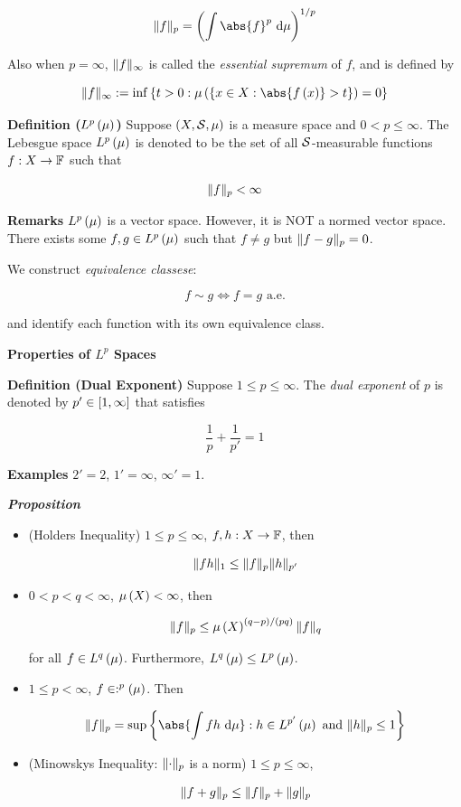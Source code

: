 \documentclass[
]{article}
\begin{document}
\[\norm{f}_p = \pr{\int \abs{f}^p\dm}^{1/p}\]

Also when \(p = \infty\), \(\norm{f}_{\infty}\) is called the
\emph{essential supremum} of \(f\), and is defined by

\[\norm{f}_{\infty}:=\inf\brace{t>0:\lm{\brace{x\in X:\abs{f\pr{x}}>t}} = 0}\]

\textbf{Definition (\(L^p\pr{\mu}\))} Suppose \(\pr{X,\S,\mu}\) is a
measure space and \(0<p\le \infty\). The Lebesgue space \(L^p\pr{\mu}\)
is denoted to be the set of all \(\S\)-measurable functions
\(f:X\to \F\) such that

\[\norm{f}_p<\infty\]

\textbf{Remarks} \(L^p\pr{\mu}\) is a vector space. However, it is NOT a
normed vector space. There exists some \(f,g\in L^p\pr{\mu}\) such that
\(f\ne g\) but \(\norm{f-g}_p = 0\).

We construct \emph{equivalence classese}:

\[f\sim g\iff f = g \text{ a.e.}\]

and identify each function with its own equivalence class.

\textbf{Properties of \(L^p\) Spaces}

\textbf{Definition (Dual Exponent)} Suppose \(1\le p\le \infty\). The
\emph{dual exponent} of \(p\) is denoted by \(p'\in \br{1,\infty}\) that
satisfies

\[\frac1p+\frac1{p'}=1\]

\textbf{Examples} \(2' = 2\), \(1'=\infty\), \(\infty' = 1\).

\emph{\textbf{Proposition}}

\begin{itemize}
\item
  (Holder\textquotesingle s Inequality) \(1\le p\le \infty\),
  \(f,h:X\to \F\), then

  \[\norm{fh}_1\le \norm{f}_p\norm{h}_{p'}\]
\item
  \(0<p<q<\infty\), \(\mu\pr{X}<\infty\), then

  \[\norm{f}_p\le \mu\pr{X}^{\pr{q-p}/\pr{pq}}\norm{f}_q\]

  for all \(f\in L^q\pr{\mu}\). Furthermore,
  \(L^q\pr{\mu}\le L^p\pr{\mu}\).
\item
  \(1\le p<\infty\), \(f\in :^p\pr{\mu}\). Then

  \[\norm{f}_p = \sup\brace{\abs{\int fh\dm}:h\in L^{p'}\pr{\mu}\text{ and }\norm{h}_p\le 1}\]
\item
  (Minowsky\textquotesingle s Inequality: \(\norm{\cdot}_p\) is a norm)
  \(1\le p\le \infty\),

  \[\norm{f+g}_p\le \norm{f}_p+\norm{g}_p\]
\end{itemize}
\end{document}
